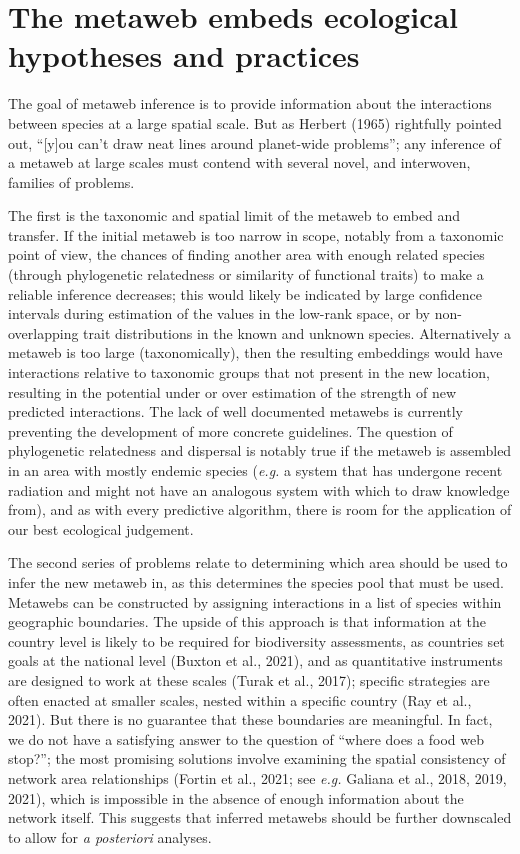 \documentclass[11pt]{article}
\begin{document}
\hypertarget{the-metaweb-embeds-ecological-hypotheses-and-practices}{%
\section{The metaweb embeds ecological hypotheses and
practices}\label{the-metaweb-embeds-ecological-hypotheses-and-practices}}

The goal of metaweb inference is to provide information about the
interactions between species at a large spatial scale. But as Herbert
(1965) rightfully pointed out, ``{[}y{]}ou can't draw neat lines around
planet-wide problems''; any inference of a metaweb at large scales must
contend with several novel, and interwoven, families of problems.

The first is the taxonomic and spatial limit of the metaweb to embed and
transfer. If the initial metaweb is too narrow in scope, notably from a
taxonomic point of view, the chances of finding another area with enough
related species (through phylogenetic relatedness or similarity of
functional traits) to make a reliable inference decreases; this would
likely be indicated by large confidence intervals during estimation of
the values in the low-rank space, or by non-overlapping trait
distributions in the known and unknown species. Alternatively a metaweb
is too large (taxonomically), then the resulting embeddings would have
interactions relative to taxonomic groups that not present in the new
location, resulting in the potential under or over estimation of the
strength of new predicted interactions. The lack of well documented
metawebs is currently preventing the development of more concrete
guidelines. The question of phylogenetic relatedness and dispersal is
notably true if the metaweb is assembled in an area with mostly endemic
species (\emph{e.g.} a system that has undergone recent radiation and
might not have an analogous system with which to draw knowledge from),
and as with every predictive algorithm, there is room for the
application of our best ecological judgement.

The second series of problems relate to determining which area should be
used to infer the new metaweb in, as this determines the species pool
that must be used. Metawebs can be constructed by assigning interactions
in a list of species within geographic boundaries. The upside of this
approach is that information at the country level is likely to be
required for biodiversity assessments, as countries set goals at the
national level (Buxton et al., 2021), and as quantitative instruments
are designed to work at these scales (Turak et al., 2017); specific
strategies are often enacted at smaller scales, nested within a specific
country (Ray et al., 2021). But there is no guarantee that these
boundaries are meaningful. In fact, we do not have a satisfying answer
to the question of ``where does a food web stop?''; the most promising
solutions involve examining the spatial consistency of network area
relationships (Fortin et al., 2021; see \emph{e.g.} Galiana et al.,
2018, 2019, 2021), which is impossible in the absence of enough
information about the network itself. This suggests that inferred
metawebs should be further downscaled to allow for \emph{a posteriori}
analyses.
\end{document}
